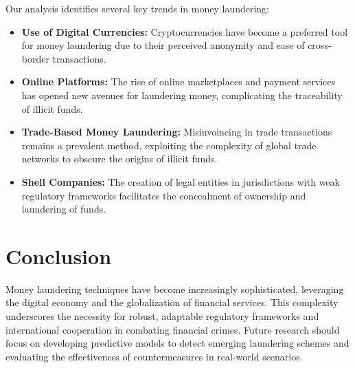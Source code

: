 \documentclass{article}
\begin{document}
Our analysis identifies several key trends in money laundering:
\begin{itemize}
    \item \textbf{Use of Digital Currencies:} Cryptocurrencies have become a preferred tool for money laundering due to their perceived anonymity and ease of cross-border transactions.
    \item \textbf{Online Platforms:} The rise of online marketplaces and payment services has opened new avenues for laundering money, complicating the traceability of illicit funds.
    \item \textbf{Trade-Based Money Laundering:} Misinvoincing in trade transactions remains a prevalent method, exploiting the complexity of global trade networks to obscure the origins of illicit funds.
    \item \textbf{Shell Companies:} The creation of legal entities in jurisdictions with weak regulatory frameworks facilitates the concealment of ownership and laundering of funds.
\end{itemize}

\section{Conclusion}

Money laundering techniques have become increasingly sophisticated, leveraging the digital economy and the globalization of financial services. This complexity underscores the necessity for robust, adaptable regulatory frameworks and international cooperation in combating financial crimes. Future research should focus on developing predictive models to detect emerging laundering schemes and evaluating the effectiveness of countermeasures in real-world scenarios.
\end{document}
